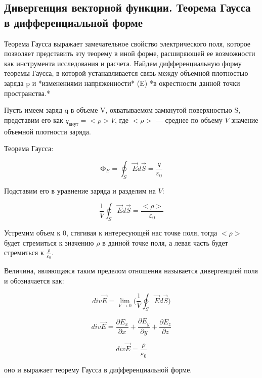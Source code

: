 \subsection{Дивергенция векторной функции. Теорема Гаусса в дифференциальной форме}

Теорема Гаусса выражает замечательное свойство электрического поля, которое позволяет представить эту теорему в иной форме, расширяющей ее возможности как инструмента исследования и расчета. Найдем дифференциальную форму теоремы Гаусса, в которой устанавливается связь между объемной плотностью заряда p и *изменениями напряженности* (E) *в окрестности данной точки пространства.*

Пусть имеем заряд q в объеме V, охватываемом замкнутой поверхностью S, представим его как $q_{внут}=<\rho>V$, где $<\rho>$ — среднее по объему $V$ значение объемной плотности заряда.

\begin{theorem}
    Теорема Гаусса:

    $$
    Ф_E=\oint_S\vec Ed\vec S=\frac{q}{\varepsilon_0}
    $$
\end{theorem}

Подставим его в уравнение заряда и разделим на $V$:

$$\frac{1}{V}\oint_S\vec Ed\vec S=\frac{<\rho>}{\varepsilon_0}$$

Устремим объем к 0, стягивая к интересующей нас точке поля, тогда $<\rho>$ будет стремиться к значению $\rho$ в данной точке поля, 
а левая часть будет стремиться к $\frac{\rho}{\varepsilon_0}$.

Величина, являющаяся таким пределом отношения называется дивергенцией поля и обозначается как:

$$
div\vec E=\lim_{V\to0}\bigg(\frac{1}{V}\oint_S\vec Ed\vec S\bigg)
$$

$$
div\vec E= \frac{\partial E_x}{\partial x} + \frac{\partial E_y}{\partial y} + \frac{\partial E_z}{\partial z}
$$

$$
div\vec E=\frac{\rho}{\varepsilon_0}
$$

оно и выражает теорему Гаусса в дифференциальной форме.